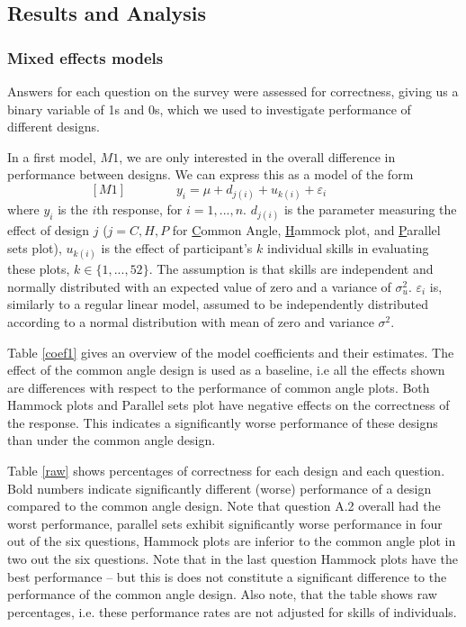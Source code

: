 \subsection{Results and Analysis}\label{results}
\subsubsection{Mixed effects models}
Answers for each question on the survey were assessed for correctness, giving us a binary variable of 1s and 0s, which we used to investigate performance of different designs. 

In a first model, $M1$, we are only interested in the overall difference in performance between designs. We can express this as a model of the form
\begin{equation}\label{model1}[M1]
\qquad\qquad y_i = \mu + d_{j(i)} + u_{k(i)} + \varepsilon_i \qquad\qquad
\end{equation}
where $y_i$ is the $i$th response, for $i = 1, ..., n$. $d_{j(i)}$ is the parameter measuring the effect of design $j$ ($j = C, H, P$ for \underline{C}ommon Angle, \underline{H}ammock plot, and \underline{P}arallel sets plot), $u_{k(i)}$ is the effect of participant's $k$ individual skills in evaluating these plots, $k \in \{1, ..., 52\}$. The assumption is that skills are independent and normally distributed with an expected value of zero and a variance of $\sigma_u^2$.
$\varepsilon_i$ is, similarly to a regular linear model, assumed to be independently distributed according to a normal distribution with mean of zero and variance $\sigma^2$.

Table \ref{coef1} gives an overview of the model coefficients and their estimates. The effect of the common angle design is used as a baseline, i.e all the effects shown are differences with respect to the performance of common angle plots. Both Hammock plots and Parallel sets plot have negative effects on the correctness of the response. This indicates a significantly worse performance of these designs than under the common angle design.

Table \ref{raw} shows percentages of correctness for each design and each question. Bold numbers indicate significantly different (worse) performance of a design compared to the common angle design. Note that question A.2 overall had the worst performance, parallel sets  exhibit significantly worse performance in four out of the six questions, Hammock plots are inferior to the common angle plot in two out the six questions. Note that in the last question Hammock plots have the best performance -- but this is does not  constitute a significant difference to the performance of the common angle design.
Also note, that the table shows raw percentages, i.e. these performance rates are not adjusted for skills of individuals. 

